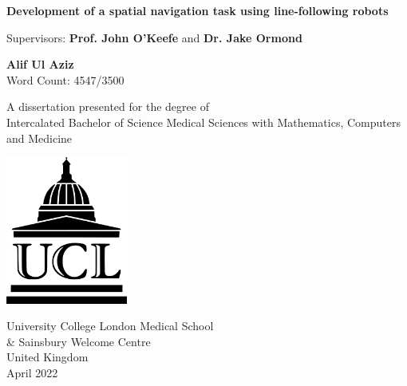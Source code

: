 \documentclass{article}
\newcommand{\detailtexcount}[1]{%
  \immediate\write18{texcount -merge -sum -q #1.tex output.bbl > #1.wcdetail }%
}
\newcommand{\quickwordcount}[1]{%
  \immediate\write18{texcount -1 -sum -merge -q #1.tex output.bbl > #1-words.sum }%
   words%
}
\newcommand{\quickcharcount}[1]{%
  \immediate\write18{texcount -1 -sum -merge -char -q #1.tex output.bbl > #1-chars.sum }%
   characters (not including spaces)%
}
\begin{document}
\doublespacing


\begin{titlepage}
   \begin{center}
       \vspace*{0.5cm}
    \large
       \textbf{Development of a spatial navigation task using line-following robots}

       \vspace{0.5cm}
        Supervisors: \textbf{Prof. John O'Keefe} and \textbf{Dr. Jake Ormond}
            
       \vspace{1.5cm}

       \textbf{Alif Ul Aziz} \\
       Word Count: 4547/3500
       \vfill
            
       A dissertation presented for the degree of\\
       Intercalated Bachelor of Science Medical Sciences with Mathematics, Computers and Medicine
            
       \vspace{0.8cm}
     
       \includegraphics[width=0.3\textwidth]{images/ucl_logo.png}
    
        \vspace{1 cm}
       University College London Medical School \\ \& Sainsbury Welcome Centre\\
       United Kingdom\\
       April 2022
            
   \end{center}
\end{titlepage}



\tableofcontents
\pagebreak
\end{document}
